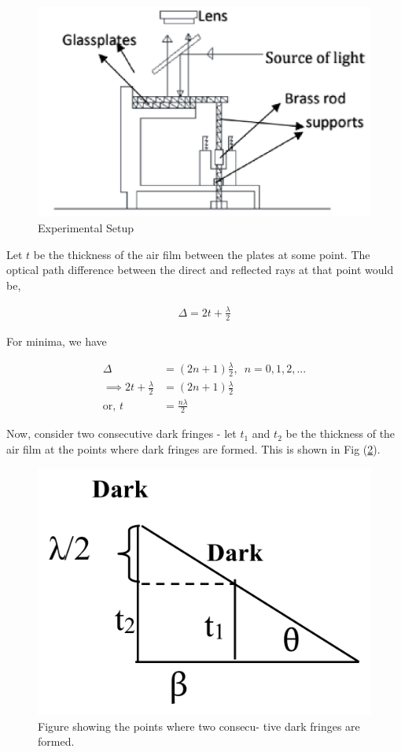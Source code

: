 \begin{figure}[H]
    \centering
    \includegraphics[width=0.8\columnwidth]{images/f1.png}
    \caption{Experimental Setup}
    \label{fig:1}
\end{figure}

Let $t$ be the thickness of the air film between the plates at
some point. The optical path difference between the direct
and reflected rays at that point would be,

\begin{align}
    \Delta = 2t + \frac{\lambda}{2}
\end{align}

For minima, we have

\begin{align}
    \Delta &= (2n+1) \frac{\lambda}{2},\,\,\,n=0, 1, 2, ... \nonumber\\
    \implies 2t + \frac{\lambda}{2} &= (2n+1) \frac{\lambda}{2} \nonumber\\
    \text{or, } t &= \frac{n\lambda}{2}
\end{align}

Now, consider two consecutive dark fringes - let $t_1$ and $t_2$ be
the thickness of the air film at the points where dark fringes
are formed. This is shown in Fig (\ref{fig:2}).

\begin{figure}[H]
    \centering
    \includegraphics[width=0.5\columnwidth]{images/f2.png}
    \caption{Figure showing the points where two consecu-
    tive dark fringes are formed.}
    \label{fig:2}
\end{figure}


